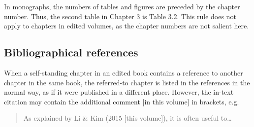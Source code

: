 \documentclass[a4paper]{article}
\newenvironment{gsrexq}{\begin{quote}\color{blue}}{\end{quote}}
\newcommand{\gsrex}[1]{{\color{blue}#1}}
\begin{document}
In monographs, the numbers of tables and figures are preceded by the
chapter number. Thus, the second table in Chapter 3 is \gsrex{Table 3.2}.
This rule does not apply to chapters in edited volumes, as the chapter
numbers are not salient here.

\subsection{Bibliographical references}\label{sec:bibliographical-references}

When a self-standing chapter in an edited book contains a reference to
another chapter in the same book, the referred-to chapter is listed in
the references in the normal way, as if it were published in a different
place. However, the in-text citation may contain the additional comment
\gsrex{[in this volume]} in brackets, e.g.

\begin{gsrexq}
As explained by Li \& Kim (2015 [this volume]), it is often useful to\ldots{} 
\end{gsrexq}
\end{document}
